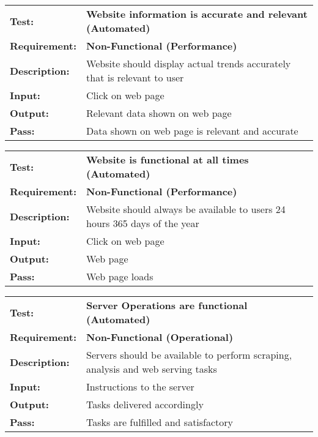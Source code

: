 \documentclass{article}
\begin{document}
	\begin{mdframed}[linewidth=1pt]
	\begin{tabularx}{\textwidth}{@{}p{3cm}X@{}}
	{\bf Test:} & {\bf Website information is accurate and relevant (Automated)}\\[\baselineskip]
	{\bf Requirement:} & {\bf Non-Functional (Performance)}\\[\baselineskip]
	{\bf Description:} & Website should display actual trends accurately that is relevant to user\\[0.5\baselineskip]
	{\bf Input:} &  Click on web page \\[0.5\baselineskip]
	{\bf Output:} & Relevant data shown on web page \\[0.5\baselineskip]
	{\bf Pass:} & Data shown on web page is relevant and accurate
	\end{tabularx}
	\end{mdframed}
	

	\begin{mdframed}[linewidth=1pt]
	\begin{tabularx}{\textwidth}{@{}p{3cm}X@{}}
	{\bf Test:} & {\bf Website is functional at all times (Automated)}\\[\baselineskip]
	{\bf Requirement:} & {\bf Non-Functional (Performance)}\\[\baselineskip]
	{\bf Description:} & Website should always be available to users 24 hours 365 days of the year\\[0.5\baselineskip]
	{\bf Input:} &  Click on web page \\[0.5\baselineskip]
	{\bf Output:} & Web page \\[0.5\baselineskip]
	{\bf Pass:} & Web page loads
	\end{tabularx}
	\end{mdframed}


	\begin{mdframed}[linewidth=1pt]
	\begin{tabularx}{\textwidth}{@{}p{3cm}X@{}}
	{\bf Test:} & {\bf Server Operations are functional (Automated)}\\[\baselineskip]
	{\bf Requirement:} & {\bf Non-Functional (Operational)}\\[\baselineskip]
	{\bf Description:} & Servers should be available to perform scraping, analysis and web serving tasks\\[0.5\baselineskip]
	{\bf Input:} &  Instructions to the server \\[0.5\baselineskip]
	{\bf Output:} & Tasks delivered accordingly \\[0.5\baselineskip]
	{\bf Pass:} & Tasks are fulfilled and satisfactory
	\end{tabularx}
	\end{mdframed}
\end{document}
